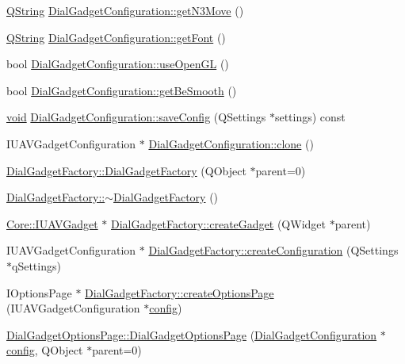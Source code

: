 \begin{DoxyCompactItemize}
\item 
\hyperlink{group___u_a_v_objects_plugin_gab9d252f49c333c94a72f97ce3105a32d}{Q\-String} \hyperlink{group___dial_plugin_ga8b12211d47ec10eb85af4daeecd76cff}{Dial\-Gadget\-Configuration\-::get\-N3\-Move} ()
\item 
\hyperlink{group___u_a_v_objects_plugin_gab9d252f49c333c94a72f97ce3105a32d}{Q\-String} \hyperlink{group___dial_plugin_ga2b36383d1efea1dc3848e79d6b73ab32}{Dial\-Gadget\-Configuration\-::get\-Font} ()
\item 
bool \hyperlink{group___dial_plugin_ga71692739b0299dea2c880fc33df5817f}{Dial\-Gadget\-Configuration\-::use\-Open\-G\-L} ()
\item 
bool \hyperlink{group___dial_plugin_ga47cfbeb46101ecdebf8073f133bbbbc1}{Dial\-Gadget\-Configuration\-::get\-Be\-Smooth} ()
\item 
\hyperlink{group___u_a_v_objects_plugin_ga444cf2ff3f0ecbe028adce838d373f5c}{void} \hyperlink{group___dial_plugin_ga77e000666d924bfc77a05a04b30d00f8}{Dial\-Gadget\-Configuration\-::save\-Config} (Q\-Settings $\ast$settings) const 
\item 
I\-U\-A\-V\-Gadget\-Configuration $\ast$ \hyperlink{group___dial_plugin_ga4cb0aa67ea10afa557dbf083d67f2510}{Dial\-Gadget\-Configuration\-::clone} ()
\item 
\hyperlink{group___dial_plugin_ga96aa76f96e82147d1054198b8e5baccc}{Dial\-Gadget\-Factory\-::\-Dial\-Gadget\-Factory} (Q\-Object $\ast$parent=0)
\item 
\hyperlink{group___dial_plugin_gaa1a6c5c829367397107f9bf058d3838f}{Dial\-Gadget\-Factory\-::$\sim$\-Dial\-Gadget\-Factory} ()
\item 
\hyperlink{class_core_1_1_i_u_a_v_gadget}{Core\-::\-I\-U\-A\-V\-Gadget} $\ast$ \hyperlink{group___dial_plugin_gaa66ae505f320ed3092d13c52533951fb}{Dial\-Gadget\-Factory\-::create\-Gadget} (Q\-Widget $\ast$parent)
\item 
I\-U\-A\-V\-Gadget\-Configuration $\ast$ \hyperlink{group___dial_plugin_ga19fedc047658860b63df440fcd9d58c0}{Dial\-Gadget\-Factory\-::create\-Configuration} (Q\-Settings $\ast$q\-Settings)
\item 
I\-Options\-Page $\ast$ \hyperlink{group___dial_plugin_gabea23502f0a1a7c8b37131c0a24faeb8}{Dial\-Gadget\-Factory\-::create\-Options\-Page} (I\-U\-A\-V\-Gadget\-Configuration $\ast$\hyperlink{deflate_8c_a4473b5227787415097004fd39f55185e}{config})
\item 
\hyperlink{group___dial_plugin_gaeac54ffbddafca4f7d4b61d9d8af758a}{Dial\-Gadget\-Options\-Page\-::\-Dial\-Gadget\-Options\-Page} (\hyperlink{class_dial_gadget_configuration}{Dial\-Gadget\-Configuration} $\ast$\hyperlink{deflate_8c_a4473b5227787415097004fd39f55185e}{config}, Q\-Object $\ast$parent=0)

\end{DoxyCompactItemize}

